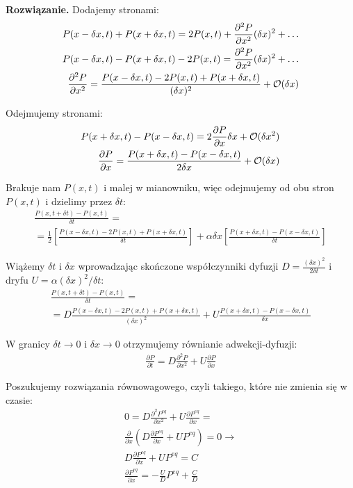 \documentclass[11pt,a4paper]{article}
\newenvironment{solution}{\vspace{1cm} \par\textbf{Rozwiązanie.} \vspace{1cm}}{}
\begin{document}
\begin{solution}
Dodajemy stronami:
\begin{align*}
    P(x - \delta x, t) + P(x + \delta x, t) = 2P(x, t) + \frac{\partial^2 P}{\partial x^2} (\delta x)^2 + \ldots \\
    P(x- \delta x, t) - P(x + \delta x, t) - 2P(x,t) = \frac{\partial^2 P}{\partial x^2} (\delta x)^2 + \ldots \\
    \frac{\partial^2 P}{\partial x^2} = \frac{P(x- \delta x, t) - 2P(x,t) + P(x + \delta x, t)}{(\delta x)^2} + {\cal O}(\delta x) \\
\end{align*}

Odejmujemy stronami:
\begin{align*}
    P(x + \delta x, t) - P(x - \delta x, t) = 2 \frac{\partial P}{\partial x} \delta x + {\cal O}(\delta x^2) \\
    \frac{\partial P}{\partial x} = \frac{P(x + \delta x, t) - P(x - \delta x, t)}{2 \delta x} + {\cal O}(\delta x)
\end{align*}



Brakuje nam $P(x, t)$ i malej w mianowniku, więc odejmujemy od obu stron $P(x, t)$ i dzielimy 
przez $\delta t$:
\begin{align*}
    \frac{P(x, t + \delta t) - P(x, t)}{\delta t} =  \\
    = \frac{1}{2} \left[ \frac{P(x - \delta x, t) - 2P(x, t) + P(x + \delta x, t)}{\delta t} \right] + 
    \alpha \delta x \left[ \frac{P(x + \delta x, t) - P(x - \delta x, t)}{\delta t} \right]
\end{align*}

Wiążemy $\delta t$ i $\delta x$ wprowadzając skończone  współczynniki 
dyfuzji $D = \frac{(\delta x)^2}{2\delta t}$ 
i  dryfu $U = \alpha (\delta x)^2 / \delta t$:
\begin{align*}
    \frac{P(x, t + \delta t) - P(x, t)}{\delta t} =  \\
    = D \frac{P(x - \delta x, t) - 2P(x, t) + P(x + \delta x, t)}{(\delta x)^2} +
    U \frac{P(x + \delta x, t) - P(x - \delta x, t)}{\delta x}
\end{align*}

W granicy $\delta t \to 0$ i  $\delta x \to 0$ otrzymujemy równianie adwekcji-dyfuzji:
\begin{align*}
    \frac{\partial P}{\partial t} = D \frac{\partial^2 P}{\partial x^2} + U \frac{\partial P}{\partial x}
\end{align*}

Poszukujemy rozwiązania równowagowego, czyli takiego, które nie zmienia się w czasie:
\begin{align*}
    0 = D \frac{\partial^2 P^{eq}}{\partial x^2} + U \frac{\partial P^{eq}}{\partial x} = \\
    \frac{\partial }{\partial x}\left(D \frac{\partial P^{eq}}{\partial x} + U P^{eq}\right) = 0 \rightarrow \\
    D \frac{\partial P^{eq}}{\partial x} + U P^{eq} = C \\
    \frac{\partial P^{eq}}{\partial x} = -\frac{U}{D} P^{eq} + \frac{C}{D}
\end{align*}


\end{solution}
\end{document}
